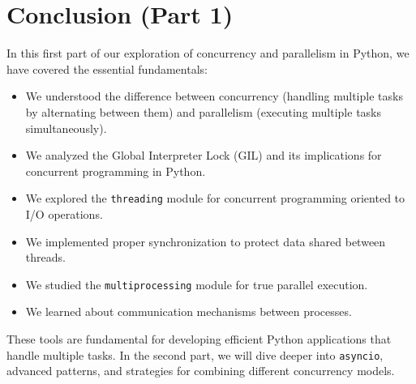 \documentclass[12pt,letterpaper]{article}
\begin{document}
\section{Conclusion (Part 1)}

In this first part of our exploration of concurrency and parallelism in Python, we have covered the essential fundamentals:

\begin{itemize}
    \item We understood the difference between concurrency (handling multiple tasks by alternating between them) and parallelism (executing multiple tasks simultaneously).
    
    \item We analyzed the Global Interpreter Lock (GIL) and its implications for concurrent programming in Python.
    
    \item We explored the \texttt{threading} module for concurrent programming oriented to I/O operations.
    
    \item We implemented proper synchronization to protect data shared between threads.
    
    \item We studied the \texttt{multiprocessing} module for true parallel execution.
    
    \item We learned about communication mechanisms between processes.
\end{itemize}

These tools are fundamental for developing efficient Python applications that handle multiple tasks. In the second part, we will dive deeper into \texttt{asyncio}, advanced patterns, and strategies for combining different concurrency models.
\end{document}
